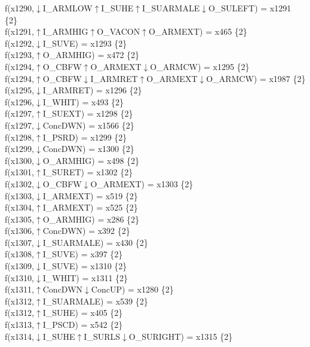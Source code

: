 f(x1290,$\downarrow$I\_ARMLOW$\uparrow$I\_SUHE$\uparrow$I\_SUARMALE$\downarrow$O\_SULEFT) = x1291 \{2\} \\  
f(x1291,$\uparrow$I\_ARMHIG$\uparrow$O\_VACON$\uparrow$O\_ARMEXT) = x465 \{2\} \\  
f(x1292,$\downarrow$I\_SUVE) = x1293 \{2\} \\  
f(x1293,$\uparrow$O\_ARMHIG) = x472 \{2\} \\  
f(x1294,$\uparrow$O\_CBFW$\uparrow$O\_ARMEXT$\downarrow$O\_ARMCW) = x1295 \{2\} \\  
f(x1294,$\uparrow$O\_CBFW$\downarrow$I\_ARMRET$\uparrow$O\_ARMEXT$\downarrow$O\_ARMCW) = x1987 \{2\} \\  
f(x1295,$\downarrow$I\_ARMRET) = x1296 \{2\} \\  
f(x1296,$\downarrow$I\_WHIT) = x493 \{2\} \\  
f(x1297,$\uparrow$I\_SUEXT) = x1298 \{2\} \\  
f(x1297,$\downarrow$ConcDWN) = x1566 \{2\} \\  
f(x1298,$\uparrow$I\_PSRD) = x1299 \{2\} \\  
f(x1299,$\downarrow$ConcDWN) = x1300 \{2\} \\  
f(x1300,$\downarrow$O\_ARMHIG) = x498 \{2\} \\  
f(x1301,$\uparrow$I\_SURET) = x1302 \{2\} \\  
f(x1302,$\downarrow$O\_CBFW$\downarrow$O\_ARMEXT) = x1303 \{2\} \\  
f(x1303,$\downarrow$I\_ARMEXT) = x519 \{2\} \\  
f(x1304,$\uparrow$I\_ARMEXT) = x525 \{2\} \\  
f(x1305,$\uparrow$O\_ARMHIG) = x286 \{2\} \\  
f(x1306,$\uparrow$ConcDWN) = x392 \{2\} \\  
f(x1307,$\downarrow$I\_SUARMALE) = x430 \{2\} \\  
f(x1308,$\uparrow$I\_SUVE) = x397 \{2\} \\  
f(x1309,$\downarrow$I\_SUVE) = x1310 \{2\} \\  
f(x1310,$\downarrow$I\_WHIT) = x1311 \{2\} \\  
f(x1311,$\uparrow$ConcDWN$\downarrow$ConcUP) = x1280 \{2\} \\  
f(x1312,$\uparrow$I\_SUARMALE) = x539 \{2\} \\  
f(x1312,$\uparrow$I\_SUHE) = x405 \{2\} \\  
f(x1313,$\uparrow$I\_PSCD) = x542 \{2\} \\  
f(x1314,$\downarrow$I\_SUHE$\uparrow$I\_SURLS$\downarrow$O\_SURIGHT) = x1315 \{2\} \\  
